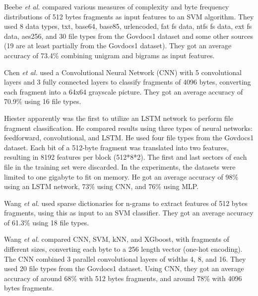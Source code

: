 Beebe \textit{et al.} \cite{beebe_sceadan:_2013}
compared various measures of complexity and byte frequency distributions of 512 bytes fragments as input features to an SVM algorithm. They used 8 data types, txt, base64, base85, urlencoded, fat fs data, ntfs fs data, ext fs data, aes256, and
30 file types
from the Govdocs1 dataset and some other sources (19 are at least partially from the Govdocs1 dataset). They got an average accuracy of 73.4\% combining unigram and bigrams as input features.

Chen \textit{et al.} \cite{chen_file_2018}
used a Convolutional Neural Network (CNN) with 5 convolutional layers and 3 fully connected layers to classify fragments of 4096 bytes, converting each fragment into a 64x64 grayscale picture.
They got an average accuracy of 70.9\% using 16 file types.

Hiester \cite{hiester_file_2018} apparently was the first to utilize an LSTM network to perform file fragment classification. He compared results using three types of neural networks: feedforward, convolutional, and LSTM. He used four file types from the Govdocs1 dataset.
Each bit of a 512-byte fragment was translated into two features, resulting in 8192 features per block (512*8*2). The first and last sectors of each file in the training set were discarded. In the experiments, the datasets were limited to one gigabyte to fit on memory. He got an average accuracy of 98\% using an LSTM network, 73\% using CNN, and 76\% using MLP.

Wang \textit{et al.} \cite{wang_sparse_2018} 
used sparse dictionaries for n-grams to extract features of 512 bytes fragments, using this as input to an SVM classifier.
They got an average accuracy of 61.3\% using 18 file types.

Wang \textit{et al.} \cite{wang_file_2018}  
compared CNN, SVM, kNN, and XGboost, with fragments of different sizes, converting each byte to a 256 length vector (one-hot encoding). The CNN combined 3 parallel convolutional layers of widths 4, 8, and 16.
They used 20 file types from the Govdocs1 dataset.
Using CNN, they got an average accuracy of around 68\% with 512 bytes fragments, and around 78\% with 4096 bytes fragments.

